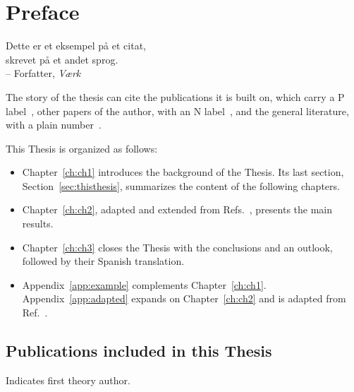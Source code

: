 \documentclass[../main]{subfiles}
\begin{document}
\chapter{Preface}
\begin{otherlanguage}{danish}
\begin{chquote}
Dette er et eksempel på et citat, \\
skrevet på et andet sprog. \\
\bigskip
-- Forfatter, \textit{Værk}
\end{chquote}
\end{otherlanguage}
\vfill

\lipsum[1-2]

The story of the thesis can cite the publications it is built on, which carry a P label~\cite{Doe:PRB24, Roe:PRL25}, other papers of the author, with an N label~\cite{Lee:PRB23}, and the general literature, with a plain number~\cite{Smith:PRL20, Brown:PRB19}.
\lipsum[3]

This Thesis is organized as follows:
\begin{itemize}
    \item Chapter~\ref{ch:ch1} introduces the background of the Thesis.
    Its last section, Section~\ref{sec:thisthesis}, summarizes the content of the following chapters.

    \item Chapter~\ref{ch:ch2}, adapted and extended from Refs.~\cite{Doe:PRB24, Roe:PRL25, Doe:SP25}, presents the main results.

    \item Chapter~\ref{ch:ch3} closes the Thesis with the conclusions and an outlook, followed by their Spanish translation.

    \item Appendix~\ref{app:example} complements Chapter~\ref{ch:ch1}.
    Appendix~\ref{app:adapted} expands on Chapter~\ref{ch:ch2} and is adapted from Ref.~\cite{Doe:a26}.
\end{itemize}


\section*{Publications included in this Thesis}
\thesisSuperscript{*} Indicates first theory author.
\begin{refsection}
\nocite{*}
\newrefcontext[labelprefix=P,sorting=oldestfirst]
\printbibliography[heading=none, resetnumbers=true]
\end{refsection}
\end{document}
